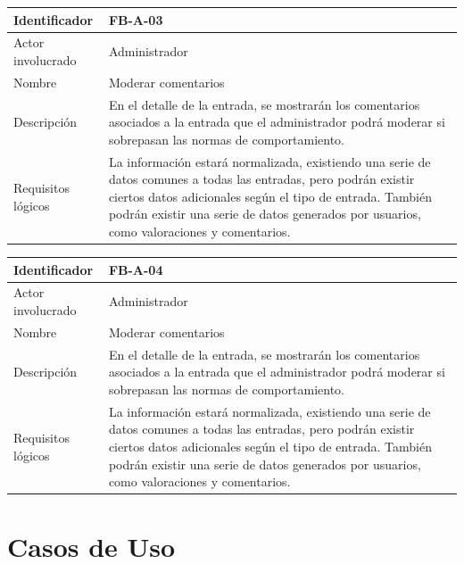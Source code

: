 \begin{table}[h!]
\centering
\begin{tabular}{|p{3cm}|p{10cm}|}
\hline
Identificador & FB-A-03 \\ \hline
Actor involucrado & Administrador \\ \hline
Nombre & Moderar comentarios\\ \hline
Descripción & En el detalle de la entrada, se mostrarán los comentarios asociados a la entrada que el administrador podrá moderar si sobrepasan las normas de comportamiento. \\ \hline
Requisitos lógicos & La información estará normalizada, existiendo una serie de datos comunes a todas las entradas, pero podrán existir ciertos datos adicionales según el tipo de entrada. También podrán existir una serie de datos generados por usuarios, como valoraciones y comentarios. \\ \hline
\end{tabular}
\end{table}

\begin{table}[h!]
\centering
\begin{tabular}{|p{3cm}|p{10cm}|}
\hline
Identificador & FB-A-04 \\ \hline
Actor involucrado & Administrador \\ \hline
Nombre & Moderar comentarios\\ \hline
Descripción & En el detalle de la entrada, se mostrarán los comentarios asociados a la entrada que el administrador podrá moderar si sobrepasan las normas de comportamiento. \\ \hline
Requisitos lógicos & La información estará normalizada, existiendo una serie de datos comunes a todas las entradas, pero podrán existir ciertos datos adicionales según el tipo de entrada. También podrán existir una serie de datos generados por usuarios, como valoraciones y comentarios. \\ \hline
\end{tabular}
\end{table}


\section{Casos de Uso}

